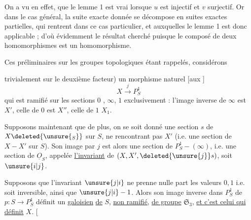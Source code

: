 On a vu en effet, que le lemme 1 est vrai lorsque $u$ est injectif et $v$ surjectif. Or dans le cas général, la suite exacte donnée se décompose en suites exactes partielles,
qui rentrent dans ce cas particulier, et auxquelles le lemme 1 est donc applicable ; d'où évidemment le résultat cherché puisque le composé de deux homomorphismes est un homomorphisme.

Ces préliminaires sur les groupes topologiques étant rappelés, considérons

trivialement sur le deuxième facteur) un morphisme naturel [aux ]
\[
X\xrightarrow{j}P^1_S
\]
qui est ramifié sur les sections $0$ \deleted{$\unsure{\infty}$}, $\infty$, $1$  exclusivement : l'image inverse de $\infty$ est $X'$, celle de $0$ est $X''$, celle de $1$  $X_1$.

Supposons maintenant que de plus, on se soit donné une section $s$ de $X\deleted{\unsure{_S}}$ sur $S$, ne rencontrant pas $X'$ (i.e. une section de $X-X'$ sur $S$). Son image par $j$ est alors une section de $P^1_S-(\infty)$, i.e. une section de $\underline O_S$, appelée \uline{l'invariant} de $(X,X',\deleted{\unsure{j}}s)$, soit  $\unsure{i|j}$.

Supposons que l'invariant $\unsure{j|i}$ ne prenne nulle part les valeurs $0,1$ i.e. soit inversible, ainsi que $\unsure{j|i}-1$. Alors son image inverse dans $P^1_S$  de $p:S\to P^1_S$ définit un   \uline{galoisien} \uline{de} $S$, \uline{non ramifié}, \uline{de groupe} $\mathfrak S_3$,  \uline{et c'est celui qui définit} $X$. [

